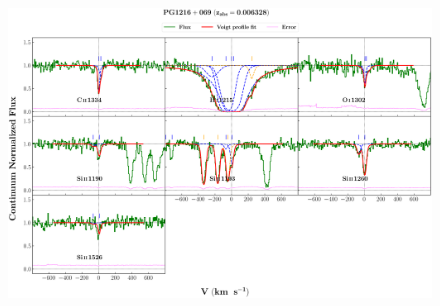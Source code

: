 \documentclass[12pt]{report}
\begin{document}
\newpage

\begin{landscape}

\begin{figure}
    \centering
    \vspace{-20mm}
    \hspace*{-35mm}
    \includegraphics[width=1.25\linewidth]{System-Plots/PG1216+069_z=0.006328_sys_plot.png}
\end{figure}

\end{landscape}
\end{document}
